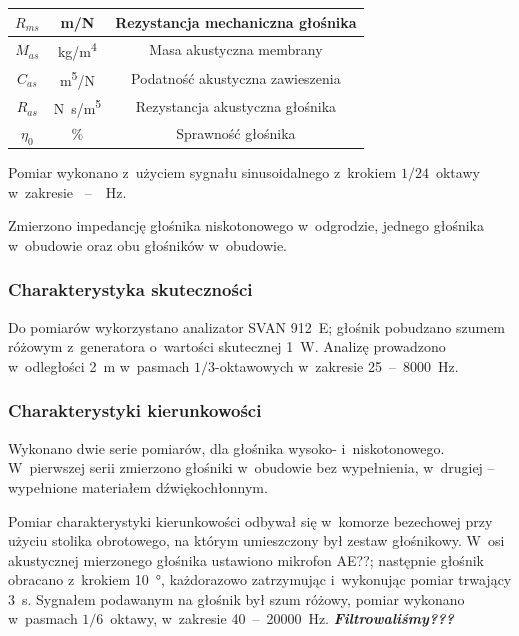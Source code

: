 \documentclass[12pt]{oska}
\newcommand{\range}[2]{\num{#1}~--~\num{#2}}
\newcommand{\comment}[1]{{\color{magenta}\emph{\textbf{#1}}}}
\begin{document}
\begin{table}[!h]
\begin{tabular}{|c|c|c|}
					$R_{ms}$ & \si[per-mode=symbol]{\metre\per\newton} & Rezystancja mechaniczna głośnika \\\hline
					\hline
					$M_{as}$ & \si[per-mode=symbol]{\kilo\gram\per\metre\tothe{4}} & Masa akustyczna membrany \\\hline
					$C_{as}$ & \si[per-mode=symbol]{\metre\tothe{5}\per\newton} & Podatność akustyczna zawieszenia \\\hline
					$R_{as}$ & \si[per-mode=symbol]{\newton\s\per\metre\tothe{5}} & Rezystancja akustyczna głośnika \\\hline
					\hline
					$\eta_0$ & \% & Sprawność głośnika \\\hline
				\end{tabular}
			\end{table}

			
			Pomiar wykonano z~użyciem sygnału sinusoidalnego z~krokiem $1/24$~oktawy w~zakresie \range{}{}~\si{\Hz}.
			
			Zmierzono impedancję głośnika niskotonowego w~odgrodzie, jednego głośnika w~obudowie oraz obu głośników w~obudowie.
			
		\subsubsection{Charakterystyka skuteczności}
			
			Do pomiarów wykorzystano analizator SVAN 912~E; głośnik pobudzano szumem różowym z~generatora o~wartości skutecznej \SI{1}{\watt}. Analizę prowadzono w~odległości \SI{2}{\metre} w~pasmach $1/3$-oktawowych w~zakresie \range{25}{8000}~\si{\Hz}.
			
		\subsubsection{Charakterystyki kierunkowości}
			
			Wykonano dwie serie pomiarów, dla głośnika wysoko- i~niskotonowego. W~pierwszej serii zmierzono głośniki w~obudowie bez wypełnienia, w~drugiej -- wypełnione materiałem dźwiękochłonnym.
			
			Pomiar charakterystyki kierunkowości odbywał się w~komorze bezechowej przy użyciu stolika obrotowego, na którym umieszczony był zestaw głośnikowy. W~osi akustycznej mierzonego głośnika ustawiono mikrofon AE??; następnie głośnik obracano z~krokiem \SI{10}{\degree}, każdorazowo zatrzymując i~wykonując pomiar trwający \SI{3}{\s}. Sygnałem podawanym na głośnik był szum różowy, pomiar wykonano w~pasmach $1/6$~oktawy, w~zakresie \range{40}{20000}~\si{\Hz}. \comment{Filtrowaliśmy???}
\end{document}
